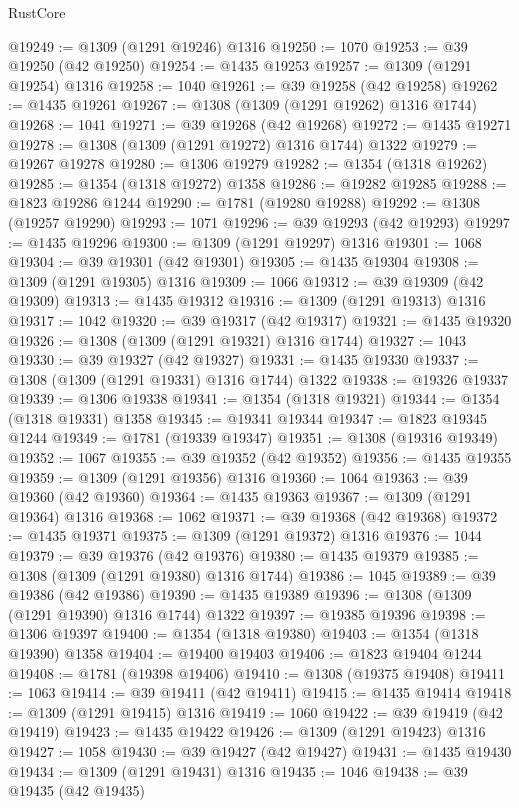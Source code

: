 \begin{lexlean}{RustCore}
\begin{coremodule}
@19249 := @1309 (@1291 @19246) @1316
@19250 := 1070
@19253 := @39 @19250 (@42 @19250)
@19254 := @1435 @19253
@19257 := @1309 (@1291 @19254) @1316
@19258 := 1040
@19261 := @39 @19258 (@42 @19258)
@19262 := @1435 @19261
@19267 := @1308 (@1309 (@1291 @19262) @1316 @1744)
@19268 := 1041
@19271 := @39 @19268 (@42 @19268)
@19272 := @1435 @19271
@19278 := @1308 (@1309 (@1291 @19272) @1316 @1744) @1322
@19279 := @19267 @19278
@19280 := @1306 @19279
@19282 := @1354 (@1318 @19262)
@19285 := @1354 (@1318 @19272) @1358
@19286 := @19282 @19285
@19288 := @1823 @19286 @1244
@19290 := @1781 (@19280 @19288)
@19292 := @1308 (@19257 @19290)
@19293 := 1071
@19296 := @39 @19293 (@42 @19293)
@19297 := @1435 @19296
@19300 := @1309 (@1291 @19297) @1316
@19301 := 1068
@19304 := @39 @19301 (@42 @19301)
@19305 := @1435 @19304
@19308 := @1309 (@1291 @19305) @1316
@19309 := 1066
@19312 := @39 @19309 (@42 @19309)
@19313 := @1435 @19312
@19316 := @1309 (@1291 @19313) @1316
@19317 := 1042
@19320 := @39 @19317 (@42 @19317)
@19321 := @1435 @19320
@19326 := @1308 (@1309 (@1291 @19321) @1316 @1744)
@19327 := 1043
@19330 := @39 @19327 (@42 @19327)
@19331 := @1435 @19330
@19337 := @1308 (@1309 (@1291 @19331) @1316 @1744) @1322
@19338 := @19326 @19337
@19339 := @1306 @19338
@19341 := @1354 (@1318 @19321)
@19344 := @1354 (@1318 @19331) @1358
@19345 := @19341 @19344
@19347 := @1823 @19345 @1244
@19349 := @1781 (@19339 @19347)
@19351 := @1308 (@19316 @19349)
@19352 := 1067
@19355 := @39 @19352 (@42 @19352)
@19356 := @1435 @19355
@19359 := @1309 (@1291 @19356) @1316
@19360 := 1064
@19363 := @39 @19360 (@42 @19360)
@19364 := @1435 @19363
@19367 := @1309 (@1291 @19364) @1316
@19368 := 1062
@19371 := @39 @19368 (@42 @19368)
@19372 := @1435 @19371
@19375 := @1309 (@1291 @19372) @1316
@19376 := 1044
@19379 := @39 @19376 (@42 @19376)
@19380 := @1435 @19379
@19385 := @1308 (@1309 (@1291 @19380) @1316 @1744)
@19386 := 1045
@19389 := @39 @19386 (@42 @19386)
@19390 := @1435 @19389
@19396 := @1308 (@1309 (@1291 @19390) @1316 @1744) @1322
@19397 := @19385 @19396
@19398 := @1306 @19397
@19400 := @1354 (@1318 @19380)
@19403 := @1354 (@1318 @19390) @1358
@19404 := @19400 @19403
@19406 := @1823 @19404 @1244
@19408 := @1781 (@19398 @19406)
@19410 := @1308 (@19375 @19408)
@19411 := 1063
@19414 := @39 @19411 (@42 @19411)
@19415 := @1435 @19414
@19418 := @1309 (@1291 @19415) @1316
@19419 := 1060
@19422 := @39 @19419 (@42 @19419)
@19423 := @1435 @19422
@19426 := @1309 (@1291 @19423) @1316
@19427 := 1058
@19430 := @39 @19427 (@42 @19427)
@19431 := @1435 @19430
@19434 := @1309 (@1291 @19431) @1316
@19435 := 1046
@19438 := @39 @19435 (@42 @19435)

\end{coremodule}
\end{lexlean}
